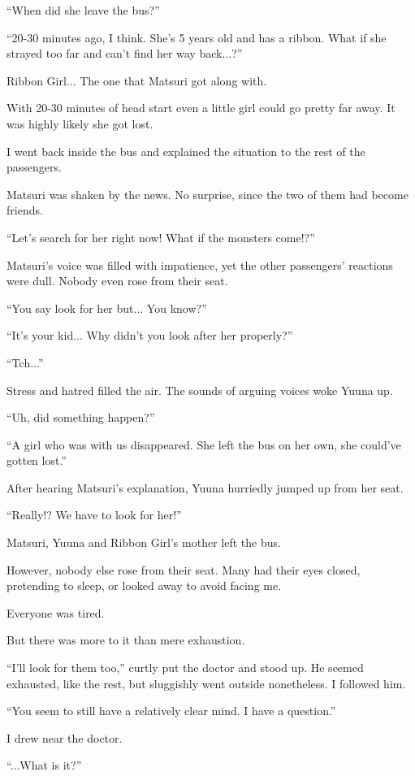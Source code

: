 ``When did she leave the bus?''

``20-30 minutes ago, I think. She's 5 years old and has a ribbon. What if she strayed too far and can't find her way back...?''

Ribbon Girl... The one that Matsuri got along with.

With 20-30 minutes of head start even a little girl could go pretty far away. It was highly likely she got lost.

I went back inside the bus and explained the situation to the rest of the passengers.

Matsuri was shaken by the news. No surprise, since the two of them had become friends.

``Let's search for her right now! What if the monsters come!?''

Matsuri's voice was filled with impatience, yet the other passengers' reactions were dull. Nobody even rose from their seat.

``You say look for her but... You know?''

``It's your kid... Why didn't you look after her properly?''

``Tch...''

Stress and hatred filled the air. The sounds of arguing voices woke Yuuna up.

``Uh, did something happen?''

``A girl who was with us disappeared. She left the bus on her own, she could've gotten lost.''

After hearing Matsuri's explanation, Yuuna hurriedly jumped up from her seat.

``Really!? We have to look for her!''

Matsuri, Yuuna and Ribbon Girl's mother left the bus.

However, nobody else rose from their seat. Many had their eyes closed, pretending to sleep, or looked away to avoid facing me.

Everyone was tired.

But there was more to it than mere exhaustion.

``I'll look for them too,'' curtly put the doctor and stood up. He seemed exhausted, like the rest, but sluggishly went outside nonetheless. I followed him.

``You seem to still have a relatively clear mind. I have a question.''

I drew near the doctor.

``...What is it?''

